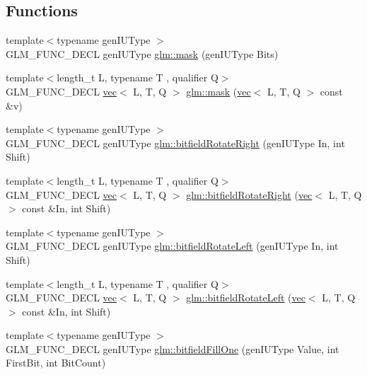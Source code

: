 \subsection*{Functions}
\begin{DoxyCompactItemize}
\item 
{\footnotesize template$<$typename gen\+I\+U\+Type $>$ }\\G\+L\+M\+\_\+\+F\+U\+N\+C\+\_\+\+D\+E\+CL gen\+I\+U\+Type \hyperlink{group__gtc__bitfield_gad7eba518a0b71662114571ee76939f8a}{glm\+::mask} (gen\+I\+U\+Type Bits)
\item 
{\footnotesize template$<$length\+\_\+t L, typename T , qualifier Q$>$ }\\G\+L\+M\+\_\+\+F\+U\+N\+C\+\_\+\+D\+E\+CL \hyperlink{structglm_1_1vec}{vec}$<$ L, T, Q $>$ \hyperlink{group__gtc__bitfield_ga2e64e3b922a296033b825311e7f5fff1}{glm\+::mask} (\hyperlink{structglm_1_1vec}{vec}$<$ L, T, Q $>$ const \&v)
\item 
{\footnotesize template$<$typename gen\+I\+U\+Type $>$ }\\G\+L\+M\+\_\+\+F\+U\+N\+C\+\_\+\+D\+E\+CL gen\+I\+U\+Type \hyperlink{group__gtc__bitfield_ga1c33d075c5fb8bd8dbfd5092bfc851ca}{glm\+::bitfield\+Rotate\+Right} (gen\+I\+U\+Type In, int Shift)
\item 
{\footnotesize template$<$length\+\_\+t L, typename T , qualifier Q$>$ }\\G\+L\+M\+\_\+\+F\+U\+N\+C\+\_\+\+D\+E\+CL \hyperlink{structglm_1_1vec}{vec}$<$ L, T, Q $>$ \hyperlink{group__gtc__bitfield_ga590488e1fc00a6cfe5d3bcaf93fbfe88}{glm\+::bitfield\+Rotate\+Right} (\hyperlink{structglm_1_1vec}{vec}$<$ L, T, Q $>$ const \&In, int Shift)
\item 
{\footnotesize template$<$typename gen\+I\+U\+Type $>$ }\\G\+L\+M\+\_\+\+F\+U\+N\+C\+\_\+\+D\+E\+CL gen\+I\+U\+Type \hyperlink{group__gtc__bitfield_ga2eb49678a344ce1495bdb5586d9896b9}{glm\+::bitfield\+Rotate\+Left} (gen\+I\+U\+Type In, int Shift)
\item 
{\footnotesize template$<$length\+\_\+t L, typename T , qualifier Q$>$ }\\G\+L\+M\+\_\+\+F\+U\+N\+C\+\_\+\+D\+E\+CL \hyperlink{structglm_1_1vec}{vec}$<$ L, T, Q $>$ \hyperlink{group__gtc__bitfield_gae186317091b1a39214ebf79008d44a1e}{glm\+::bitfield\+Rotate\+Left} (\hyperlink{structglm_1_1vec}{vec}$<$ L, T, Q $>$ const \&In, int Shift)
\item 
{\footnotesize template$<$typename gen\+I\+U\+Type $>$ }\\G\+L\+M\+\_\+\+F\+U\+N\+C\+\_\+\+D\+E\+CL gen\+I\+U\+Type \hyperlink{group__gtc__bitfield_ga46f9295abe3b5c7658f5b13c7f819f0a}{glm\+::bitfield\+Fill\+One} (gen\+I\+U\+Type Value, int First\+Bit, int Bit\+Count)

\end{DoxyCompactItemize}
